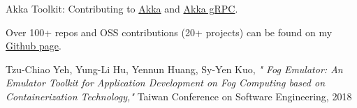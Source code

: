 \documentclass[10pt,a4paper]{article}
\begin{document}
\inlineheadsection
  {Akka Toolkit:}
  {Contributing to \href{https://github.com/akka/akka/commits/master?author=tz70s}{Akka} and \href{https://github.com/akka/akka-grpc/commits/master?author=tz70s}{Akka gRPC}.}

\vspace{0.2em}

\inlineheadsection
  {Over 100+ repos and OSS contributions (20+ projects) can be found on my \href{https://github.com/tz70s}{Github page}.}

\spacedhrule{1.6em}{-0.4em}


\vspace{0.2em}

\inlineheadsection
  {Tzu-Chiao Yeh,}
  {Yung-Li Hu, Yennun Huang, Sy-Yen Kuo, \emph{"
  Fog Emulator: An Emulator Toolkit for Application Development on Fog Computing based on Containerization Technology,"} Taiwan Conference on Software Engineering, 2018}

\vspace{0.2em}

\spacedhrule{1.6em}{-0.4em}





\end{document}
